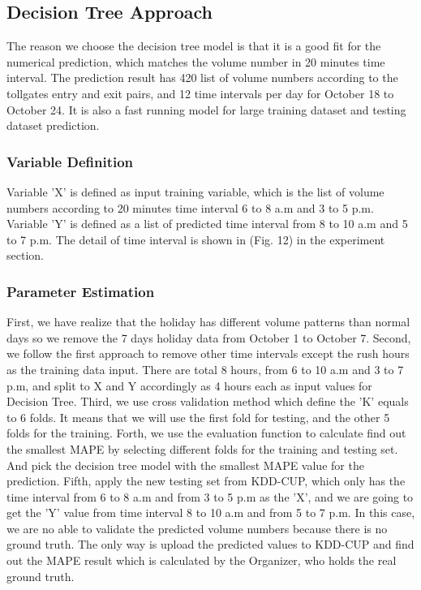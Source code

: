 \documentclass[journal, letterpaper]{IEEEtran}
\begin{document}
\subsection{Decision Tree Approach}
The reason we choose the decision tree model is that it is a good fit for the numerical prediction, which matches the volume number in 20 minutes time interval. The prediction result has 420 list of volume numbers according to the tollgates entry and exit pairs, and 12 time intervals per day for October 18 to October 24. It is also a fast running model for large training dataset and testing dataset prediction. 
\subsubsection{Variable Definition}
Variable 'X' is defined as input training variable, which is the list of volume numbers according to 20 minutes time interval 6 to 8 a.m and 3 to 5 p.m. Variable 'Y' is defined as a list of predicted time interval from 8 to 10 a.m and 5 to 7 p.m. The detail of time interval is shown in (Fig. 12) in the experiment section. 
\subsubsection{Parameter Estimation}
First, we have realize that the holiday has different volume patterns than normal days so we remove the 7 days holiday data from October 1 to October 7. 
Second, we follow the first approach to remove other time intervals except the rush hours as the training data input. There are total 8 hours, from 6 to 10 a.m and 3 to 7 p.m, and split to X and Y accordingly as 4 hours each as input values for Decision Tree. 
Third, we use cross validation method which define the 'K' equals to 6 folds. It means that we will use the first fold for testing, and the other 5 folds for the training. 
Forth, we use the evaluation function to calculate find out the smallest MAPE by selecting different folds for the training and testing set. And pick the decision tree model with the smallest MAPE value for the prediction. 
Fifth, apply the new testing set from KDD-CUP, which only has the time interval from 6 to 8 a.m and from 3 to 5 p.m as the 'X', and we are going to get the 'Y' value from time interval 8 to 10 a.m and from 5 to 7 p.m. In this case, we are no able to validate the predicted volume numbers because there is no ground truth. The only way is upload the predicted values to KDD-CUP and find out the MAPE result which is calculated by the Organizer, who holds the real ground truth. 
\end{document}
